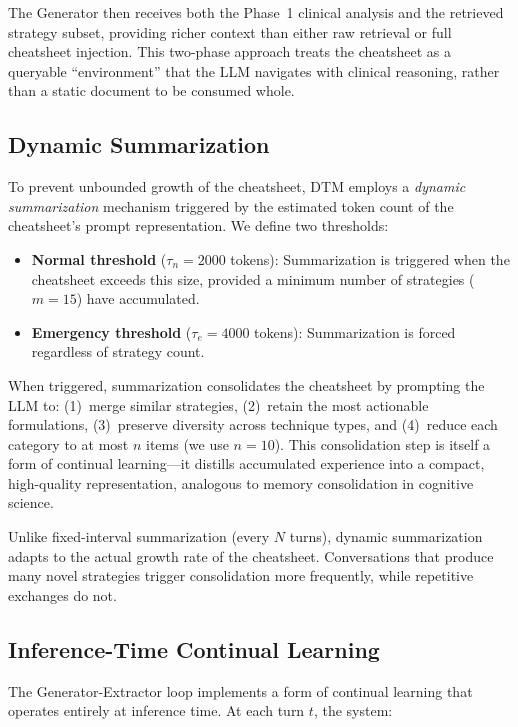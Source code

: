 The Generator then receives both the Phase~1 clinical analysis and the retrieved strategy subset, providing richer context than either raw retrieval or full cheatsheet injection. This two-phase approach treats the cheatsheet as a queryable ``environment'' that the LLM navigates with clinical reasoning, rather than a static document to be consumed whole.

\subsection{Dynamic Summarization}
\label{sec:summarization}

To prevent unbounded growth of the cheatsheet, DTM employs a \emph{dynamic summarization} mechanism triggered by the estimated token count of the cheatsheet's prompt representation. We define two thresholds:

\begin{itemize}
    \item \textbf{Normal threshold} ($\tau_n = 2000$ tokens): Summarization is triggered when the cheatsheet exceeds this size, provided a minimum number of strategies ($m = 15$) have accumulated.
    \item \textbf{Emergency threshold} ($\tau_e = 4000$ tokens): Summarization is forced regardless of strategy count.
\end{itemize}

When triggered, summarization consolidates the cheatsheet by prompting the LLM to: (1)~merge similar strategies, (2)~retain the most actionable formulations, (3)~preserve diversity across technique types, and (4)~reduce each category to at most $n$ items (we use $n = 10$). This consolidation step is itself a form of continual learning---it distills accumulated experience into a compact, high-quality representation, analogous to memory consolidation in cognitive science.

Unlike fixed-interval summarization (every $N$ turns), dynamic summarization adapts to the actual growth rate of the cheatsheet. Conversations that produce many novel strategies trigger consolidation more frequently, while repetitive exchanges do not.

\subsection{Inference-Time Continual Learning}
\label{sec:continual_learning}

The Generator-Extractor loop implements a form of continual learning that operates entirely at inference time. At each turn $t$, the system:

